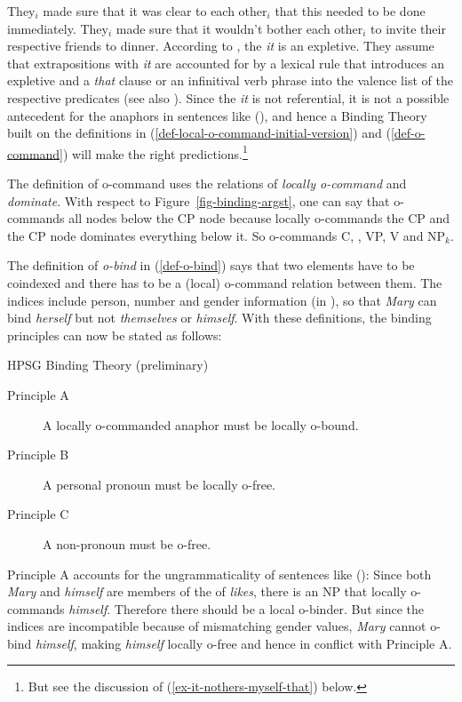 \documentclass[output=paper,biblatex,babelshorthands,newtxmath,draftmode,colorlinks,citecolor=brown]{langscibook}
\begin{document}
\ealnoraggedright
\ex They$_i$ made sure that it was clear to each other$_i$ that this needed to be done immediately.
\ex They$_i$ made sure that it wouldn't bother each other$_i$ to invite their respective friends to dinner.
\zl
According to \citet[Section~3.6]{ps2}, the \emph{it} is an expletive. They assume that
extrapositions with \emph{it} are accounted for by a lexical rule that introduces an expletive and a
\emph{that} clause or an infinitival verb phrase into the valence list of the respective predicates
(see also ). Since the \emph{it} is
not referential, it is not a possible antecedent for the anaphors in sentences like (), and
hence a Binding Theory built on the definitions in
(\ref{def-local-o-command-initial-version}) and (\ref{def-o-command}) will make the right
predictions.\footnote{
But see the discussion of (\ref{ex-it-nothers-myself-that}) below.
} 

\largerpage
The definition of o-command uses the relations of \emph{locally o-command} and \emph{dominate}. With respect to
Figure~\ref{fig-binding-argst}, one can say that \NPi o-commands all nodes below the CP node because
\NPi locally o-commands the CP and the CP node dominates everything below it. So \NPi o-commands
C, \NPj, VP, V and NP$_k$.

The definition of \emph{o-bind} in (\ref{def-o-bind}) says that two elements have to be coindexed
and there has to be a (local) o-command relation between them. The indices include person, number
and gender information (in ), so that \emph{Mary} can bind \emph{herself} but not
\emph{themselves} or \emph{himself}. With these definitions, the binding principles can now be stated
as follows:

\ea HPSG Binding Theory (preliminary)
\begin{description}
\item [Principle A] A locally o-commanded anaphor must be locally o-bound.
\item [Principle B] A personal pronoun must be locally o-free.
\item [Principle C] A non-pronoun must be o-free.
\end{description}
\z

\noindent
Principle A accounts for the ungrammaticality of sentences like ():
\eal
{}
\zl
Since both \emph{Mary} and \emph{himself} are members of the \argstl of \emph{likes}, there is an NP
that locally o-commands \emph{himself}. Therefore there should be a local o-binder. But since the
indices are incompatible because of mismatching gender values, \emph{Mary} cannot o-bind
\emph{himself}, making \emph{himself} locally o-free and hence in conflict with Principle A.
\end{document}
